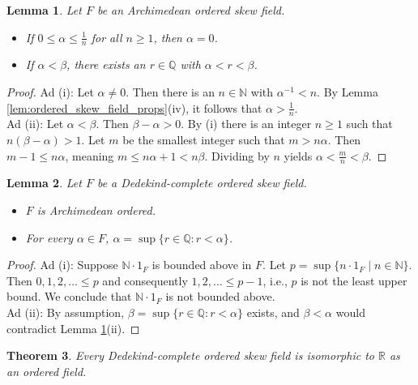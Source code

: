 \documentclass[11pt,a4paper]{article}
\newtheorem{theorem}{Theorem}[section]
\newtheorem{lemma}[theorem]{Lemma}
\begin{document}
\begin{lemma} \label{lem:archimedean_skew_field}
Let $F$ be an Archimedean ordered skew field.
\begin{itemize}
    \item[(i)] If $0 \le \alpha \le \frac{1}{n}$ for all $n \ge 1$, then $\alpha = 0$.
    \item[(ii)] If $\alpha < \beta$, there exists an $r \in \mathbb{Q}$ with $\alpha < r < \beta$.
\end{itemize}
\end{lemma}

\begin{proof}
Ad (i): Let $\alpha \neq 0$. Then there is an $n \in \mathbb{N}$ with $\alpha^{-1} < n$. By Lemma \ref{lem:ordered_skew_field_props}(iv), it follows that $\alpha > \frac{1}{n}$. \\
Ad (ii): Let $\alpha < \beta$. Then $\beta - \alpha > 0$. By (i) there is an integer $n \ge 1$ such that $n(\beta - \alpha) > 1$. Let $m$ be the smallest integer such that $m > n\alpha$. Then $m - 1 \le n\alpha$, meaning $m \le n\alpha + 1 < n\beta$. Dividing by $n$ yields $\alpha < \frac{m}{n} < \beta$.
\end{proof}

\begin{lemma} \label{lem:complete_archimedean}
Let $F$ be a Dedekind-complete ordered skew field.
\begin{itemize}
    \item[(i)] $F$ is Archimedean ordered.
    \item[(ii)] For every $\alpha \in F$, $\alpha = \sup \{r \in \mathbb{Q} : r < \alpha\}$.
\end{itemize}
\end{lemma}

\begin{proof}
Ad (i): Suppose $\mathbb{N} \cdot 1_F$ is bounded above in $F$. Let $p = \sup \{n \cdot 1_F \mid n \in \mathbb{N}\}$. Then $0, 1, 2, \dots \le p$ and consequently $1, 2, \dots \le p - 1$, i.e., $p$ is not the least upper bound. We conclude that $\mathbb{N} \cdot 1_F$ is not bounded above. \\
Ad (ii): By assumption, $\beta = \sup \{r \in \mathbb{Q} : r < \alpha\}$ exists, and $\beta < \alpha$ would contradict Lemma \ref{lem:archimedean_skew_field}(ii).
\end{proof}

\begin{theorem} \label{thm:complete_skew_field_is_reals}
Every Dedekind-complete ordered skew field is isomorphic to $\mathbb{R}$ as an ordered field.
\end{theorem}
\end{document}
